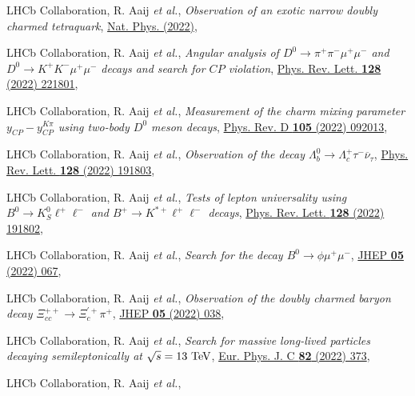 \begin{cvcontent}
\begin{enumerate}[label={[\arabic*]}, leftmargin=1.5cm]
    \item LHCb Collaboration, R. Aaij \emph{et al.}, 
    \emph{Observation of an exotic narrow doubly charmed tetraquark},
    \href{https://doi.org/10.1038/s41567-022-01614-y}{Nat. Phys. (2022)},
    \sloppy
    \item LHCb Collaboration, R. Aaij \emph{et al.}, 
    \emph{Angular analysis of $D^0 \to \pi^+\pi^-\mu^+\mu^-$ and $D^0 \to K^+K^-\mu^+\mu^-$ decays and search for $CP$ violation},
    \href{https://link.aps.org/doi/10.1103/PhysRevLett.128.221801}{Phys. Rev. Lett. \textbf{128} (2022) 221801},
    \item LHCb Collaboration, R. Aaij \emph{et al.},
    \emph{Measurement of the charm mixing parameter $y_{CP} - y_{CP}^{K\pi}$ using two-body $D^0$ meson decays},
    \href{https://link.aps.org/doi/10.1103/PhysRevD.105.092013}{Phys. Rev. D \textbf{105} (2022) 092013},
    \item LHCb Collaboration, R. Aaij \emph{et al.}, 
    \emph{Observation of the decay $\Lambda_b^0 \rightarrow \Lambda_c^+\tau^-\overline{\nu}_{\tau}$},
    \href{https://link.aps.org/doi/10.1103/PhysRevLett.128.191803}{Phys. Rev. Lett. \textbf{128} (2022) 191803},
    \item LHCb Collaboration, R. Aaij \emph{et al.}, 
    \emph{Tests of lepton universality using $B^0\to K^0_S \ell^+ \ell^-$ and $B^+\to K^{*+}\ell^+\ell^-$ decays},
    \href{https://link.aps.org/doi/10.1103/PhysRevLett.128.191802}{Phys. Rev. Lett. \textbf{128} (2022) 191802},
    \item LHCb Collaboration, R. Aaij \emph{et al.},
    \emph{Search for the decay $B^0\to\phi\mu^+\mu^-$},
    \href{https://doi.org/10.1007/JHEP05(2022)067}{JHEP \textbf{05} (2022) 067},
    \item LHCb Collaboration, R. Aaij \emph{et al.},
    \emph{Observation of the doubly charmed baryon decay $\Xi_{cc}^{++}\to \Xi_{c}^{'+}\pi^{+}$},
    \href{https://doi.org/10.1007/JHEP05(2022)038}{JHEP \textbf{05} (2022) 038},
    \item LHCb Collaboration, R. Aaij \emph{et al.}, 
    \emph{Search for massive long-lived particles decaying semileptonically at $\sqrt{s} = 13~\rm{TeV}$},
    \href{https://doi.org/10.1140/epjc/s10052-022-10186-3}{Eur. Phys. J. C \textbf{82} (2022) 373},
    \item LHCb Collaboration, R. Aaij \emph{et al.}, 

\end{enumerate}
\end{cvcontent}
